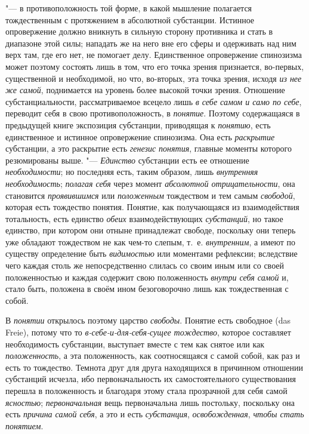 "--- в противоположность той форме, в какой мышление полагается
тождественным с протяжением в абсолютной субстанции. Истинное опровержение
должно вникнуть в сильную сторону противника и стать в
диапазоне этой силы; нападать же на него вне его сферы и одерживать над ним
верх там, где его нет, не помогает делу. Единственное опровержение
спинозизма может поэтому состоять лишь в том, что его точка зрения
признается, во-первых, существенной и необходимой, но что, во-вторых, эта
точка зрения, исходя {\em из нее же самой}, поднимается на уровень более
высокой точки зрения. Отношение субстанциальности, рассматриваемое всецело
лишь {\em в себе самом и само по себе}, переводит себя в свою
противоположность, в {\em понятие}. Поэтому содержащаяся в предыдущей книге
экспозиция субстанции, приводящая к {\em понятию}, есть единственное и
истинное опровержение спинозизма. Она есть {\em раскрытие} субстанции, а это
раскрытие есть {\em генезис понятия}, главные моменты которого резюмированы
выше. "--- {\em Единство} субстанции есть ее отношение {\em необходимости};
но последняя есть, таким образом, лишь {\em внутренняя необходимость};
{\em полагая себя} через момент {\em абсолютной отрицательности}, она
становится {\em проявившимся} или {\em положенным} тождеством и тем самым
{\em свободой}, которая есть тождество понятия. Понятие, как получающаяся из
взаимодействия тотальность, есть единство {\em обеих} взаимодействующих
{\em субстанций}, но такое единство, при котором они отныне принадлежат
свободе, поскольку они теперь уже обладают тождеством не как чем-то слепым,
т.~е. {\em внутренним}, а имеют по существу определение быть {\em видимостью}
или моментами рефлексии; вследствие чего каждая столь же непосредственно
слилась со своим иным или со своей положенностью и каждая содержит свою
положенность {\em внутри себя самой} и, стало быть, положена в своём ином
безоговорочно лишь как тождественная с собой.

В {\em понятии} открылось поэтому царство {\em свободы}. Понятие есть
свободное (das Freie), потому что то {\em в-себе-и-для-себя-сущее тождество},
которое составляет необходимость субстанции, выступает вместе с тем как
снятое или как {\em положенность}, а эта положенность, как соотносящаяся с
самой собой, как раз и есть то тождество. Темнота друг для друга находящихся
в причинном отношении субстанций исчезла, ибо первоначальность их
самостоятельного существования перешла в положенность и благодаря этому
стала прозрачной для себя самой {\em ясностью}; {\em первоначальная}
вещь
первоначальна лишь постольку, поскольку она есть {\em причина самой себя},
а это и есть {\em субстанция}, {\em освобожденная}, {\em чтобы стать понятием}.

